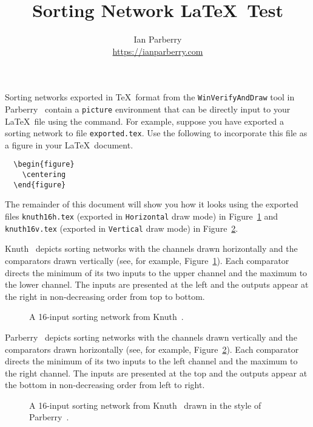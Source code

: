 \documentclass[11pt]{article}
\title{Sorting Network \LaTeX\ Test}
\author{Ian Parberry\\
\url{https://ianparberry.com}}
\date{}
\begin{document}
  \maketitle
	
	\noindent
	Sorting networks exported in \TeX\ format
	from the \verb'WinVerifyAndDraw' tool
	in Parberry~\cite{Parberry2022SNS}
	contain a \verb'picture' environment
	that can be directly input to your \LaTeX\ file using the \verb""
	command.
  For example, suppose you have exported a sorting network
	to file \verb"exported.tex". Use the following to incorporate this file
	as a figure in your \LaTeX\ document. 
	
\begin{verbatim}
  \begin{figure}
    \centering
  \end{figure}
\end{verbatim}
	
	\noindent
	The remainder of this document will show you how it looks using
	the exported files
	\verb"knuth16h.tex" (exported in \verb'Horizontal' draw mode)
	in Figure~\ref{fig-h} and
	\verb"knuth16v.tex" (exported in \verb'Vertical' draw mode) in Figure~\ref{fig-v}.
	
	Knuth~\cite{knuth1997art} depicts sorting networks with the channels
	drawn horizontally and the comparators drawn vertically (see,
	for example, Figure~\ref{fig-h}). Each comparator
	directs the minimum of its two inputs to the upper channel and the 
	maximum to the lower channel. The inputs are presented at the left
	and the outputs appear at the right in non-decreasing order from top to bottom.

	\begin{figure}[h!]
		\centering
		\caption{A 16-input sorting network from Knuth~\cite{knuth1997art}.}
		\label{fig-h}
	\end{figure}
	
	Parberry~\cite{parberry1990single, parberry1991computational, parberry1992pairwise}
	depicts sorting networks with the channels
	drawn vertically and the comparators drawn horizontally (see,
	for example, Figure~\ref{fig-v}). Each comparator
	directs the minimum of its two inputs to the left channel and the 
	maximum to the right channel. The inputs are presented at the top
	and the outputs appear at the bottom in non-decreasing order from left to right.
	
  \begin{figure}[h!]
	  \centering
		\caption{A 16-input sorting network from Knuth~\cite{knuth1997art}
		  drawn in the style 
		  of Parberry~\cite{parberry1990single, parberry1991computational, parberry1992pairwise}.}
		\label{fig-v}
  \end{figure}
	


\end{document}
